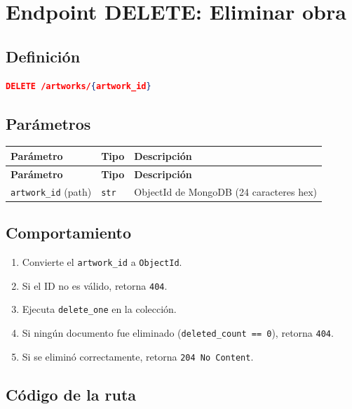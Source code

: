 \documentclass[12pt,a4paper]{article}
\begin{document}
\section{Endpoint DELETE: Eliminar obra}

\subsection{Definición}

\begin{lstlisting}[language=json]
DELETE /artworks/{artwork_id}
\end{lstlisting}

\subsection{Parámetros}

\begin{longtable}{lll}
\toprule
\textbf{Parámetro} & \textbf{Tipo} & \textbf{Descripción} \\
\midrule
\endfirsthead
\toprule
\textbf{Parámetro} & \textbf{Tipo} & \textbf{Descripción} \\
\midrule
\endhead
\bottomrule
\endfoot
\texttt{artwork\_id} (path) & \texttt{str} & ObjectId de MongoDB (24 caracteres hex) \\
\bottomrule
\end{longtable}

\subsection{Comportamiento}

\begin{enumerate}
    \item Convierte el \texttt{artwork\_id} a \texttt{ObjectId}.
    \item Si el ID no es válido, retorna \texttt{404}.
    \item Ejecuta \texttt{delete\_one} en la colección.
    \item Si ningún documento fue eliminado (\texttt{deleted\_count == 0}), retorna \texttt{404}.
    \item Si se eliminó correctamente, retorna \texttt{204 No Content}.
\end{enumerate}

\subsection{Código de la ruta}
\end{document}
